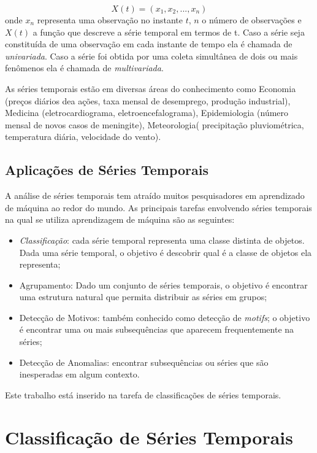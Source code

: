 \begin{equation} \label{eq_TS}
X(t) = (x_1,x_2,...,x_n)
\end{equation}
onde $x_n$ representa uma observação no instante $t$, $n$ o número de observações e $X(t)$ a função que descreve a série temporal em termos de t. Caso a série seja constituída de uma observação em cada instante de tempo ela é chamada de \textit{univariada}. Caso a série foi obtida por uma coleta simultânea de dois ou mais fenômenos ela é chamada de \textit{multivariada}.

As séries temporais estão em diversas áreas do conhecimento como Economia (preços diários dea ações, taxa mensal de desemprego, produção industrial), Medicina (eletrocardiograma, eletroencefalograma), Epidemiologia (número mensal de novos casos de meningite), Meteorologia( precipitação pluviométrica, temperatura diária, velocidade do vento).

\subsection{Aplicações de Séries Temporais}
A análise de séries temporais tem atraído muitos pesquisadores em aprendizado de máquina ao redor do mundo. As principais tarefas envolvendo séries temporais na qual se utiliza aprendizagem de máquina são as seguintes:

\begin{itemize}
	\item \textit{Classificação}: cada série temporal representa uma classe distinta de objetos. Dada uma série temporal, o objetivo é descobrir qual é a classe de objetos ela representa; 
	\item Agrupamento: Dado um conjunto de séries temporais, o objetivo é encontrar uma estrutura natural que permita distribuir as séries em grupos; 
	\item Detecção de Motivos: também conhecido como detecção de \textit{motifs}; o objetivo é encontrar uma ou mais subsequências que aparecem frequentemente na séries;
	\item Detecção de Anomalias: encontrar subsequências ou séries que são inesperadas em algum contexto.
\end{itemize}
Este trabalho está inserido na tarefa de classificações de séries temporais.
\section{Classificação de Séries Temporais}


